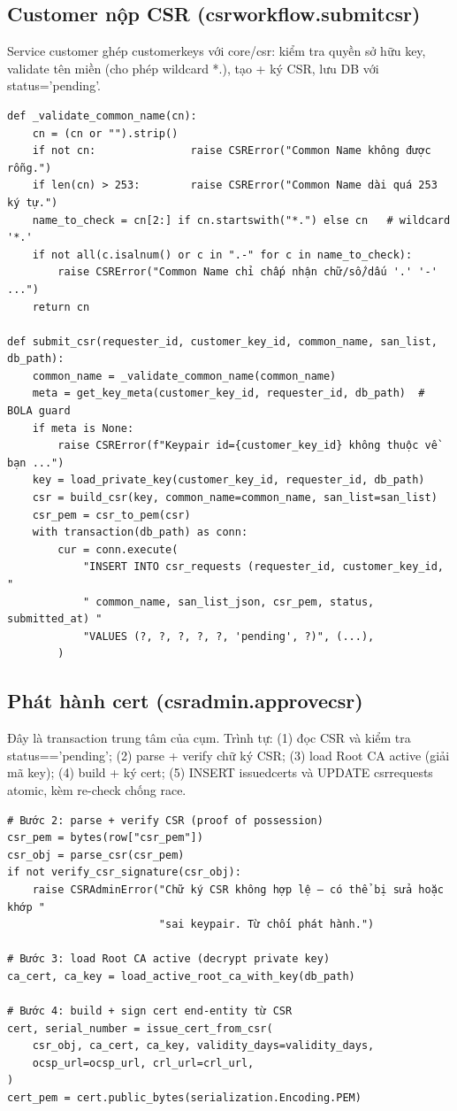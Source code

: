 \documentclass[12pt,a4paper]{article}
\newcommand{\code}[1]{{\ttfamily\small\def\_{\textunderscore\discretionary{}{}{}}#1}}
\begin{document}
\subsection{Customer nộp CSR (\code{csr\_workflow.submit\_csr})}

Service customer ghép \code{customer\_keys} với \code{core/csr}: kiểm tra quyền
sở hữu key, validate tên miền (cho phép wildcard \code{*.}), tạo + ký CSR, lưu
DB với \code{status='pending'}.

\begin{Verbatim}
def _validate_common_name(cn):
    cn = (cn or "").strip()
    if not cn:               raise CSRError("Common Name không được rỗng.")
    if len(cn) > 253:        raise CSRError("Common Name dài quá 253 ký tự.")
    name_to_check = cn[2:] if cn.startswith("*.") else cn   # wildcard '*.'
    if not all(c.isalnum() or c in ".-" for c in name_to_check):
        raise CSRError("Common Name chỉ chấp nhận chữ/số/dấu '.' '-' ...")
    return cn

def submit_csr(requester_id, customer_key_id, common_name, san_list, db_path):
    common_name = _validate_common_name(common_name)
    meta = get_key_meta(customer_key_id, requester_id, db_path)  # BOLA guard
    if meta is None:
        raise CSRError(f"Keypair id={customer_key_id} không thuộc về bạn ...")
    key = load_private_key(customer_key_id, requester_id, db_path)
    csr = build_csr(key, common_name=common_name, san_list=san_list)
    csr_pem = csr_to_pem(csr)
    with transaction(db_path) as conn:
        cur = conn.execute(
            "INSERT INTO csr_requests (requester_id, customer_key_id, "
            " common_name, san_list_json, csr_pem, status, submitted_at) "
            "VALUES (?, ?, ?, ?, ?, 'pending', ?)", (...),
        )
\end{Verbatim}

\subsection{Phát hành cert (\code{csr\_admin.approve\_csr})}

Đây là transaction trung tâm của cụm. Trình tự: (1) đọc CSR và kiểm tra
\code{status=='pending'}; (2) parse + verify chữ ký CSR; (3) load Root CA active
(giải mã key); (4) build + ký cert; (5) INSERT \code{issued\_certs} và UPDATE
\code{csr\_requests} atomic, kèm re-check chống race.

\begin{Verbatim}
# Bước 2: parse + verify CSR (proof of possession)
csr_pem = bytes(row["csr_pem"])
csr_obj = parse_csr(csr_pem)
if not verify_csr_signature(csr_obj):
    raise CSRAdminError("Chữ ký CSR không hợp lệ — có thể bị sửa hoặc khớp "
                        "sai keypair. Từ chối phát hành.")

# Bước 3: load Root CA active (decrypt private key)
ca_cert, ca_key = load_active_root_ca_with_key(db_path)

# Bước 4: build + sign cert end-entity từ CSR
cert, serial_number = issue_cert_from_csr(
    csr_obj, ca_cert, ca_key, validity_days=validity_days,
    ocsp_url=ocsp_url, crl_url=crl_url,
)
cert_pem = cert.public_bytes(serialization.Encoding.PEM)
\end{Verbatim}
\end{document}
